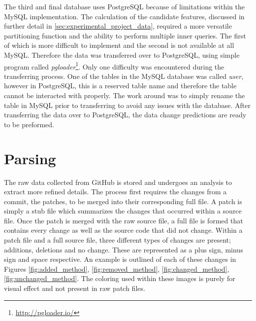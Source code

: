 The third and final database uses PostgreSQL because of limitations within the MySQL implementation. The calculation of the candidate features, discussed in further detail in \autoref{sec:experimental_project_data}, required a more versatile partitioning function and the ability to perform multiple inner queries. The first of which is more difficult to implement and the second is not available at all MySQL. Therefore the data was transferred over to PostgreSQL, using simple program called \textit{pgloader}\footnote{\url{http://pgloader.io/}}. Only one difficulty was encountered during the transferring process. One of the tables in the MySQL database was called \textit{user}, however in PostgreSQL, this is a reserved table name and therefore the table cannot be interacted with properly. The work around was to simply rename the table in MySQL prior to transferring to avoid any issues with the database. After transferring the data over to PostgreSQL, the data change predictions are ready to be preformed.

\section{Parsing}
\label{sec:parsing}

The raw data collected from GitHub is stored and undergoes an analysis to extract more refined details. The process first requires the changes from a commit, the patches, to be merged into their corresponding full file. A patch is simply a stub file which summarizes the changes that occurred within a source file. Once the patch is merged with the raw source file, a full file is formed that contains every change as well as the source code that did not change. Within a patch file and a full source file, three different types of changes are present; additions, deletions and no change. These are represented as a plus sign, minus sign and space respective. An example is outlined of each of these changes in Figures \ref{fig:added_method}, \ref{fig:removed_method}, \ref{fig:changed_method}, \ref{fig:unchanged_method}. The coloring used within these images is purely for visual effect and not present in raw patch files.

